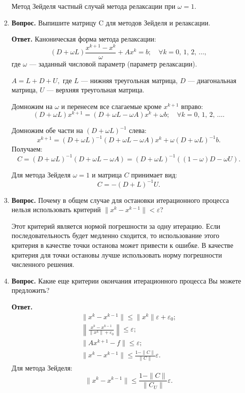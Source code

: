 \documentclass[12pt, a4paper]{article}
\begin{document}
\begin{enumerate}
  Метод Зейделя частный случай метода релаксации при $ \omega = 1 $.
  
  	\item  \textbf{Вопрос.}	Выпишите матрицу C для методов Зейделя и релаксации.
  	
  \textbf{Ответ.}	Каноническая форма метода релаксации:
  	$$	\left( D + \omega L \right) \frac{x^{k + 1} - x^k}{\omega} + A x^k = b;\quad \forall k = 0,\, 1,\, 2,\, \dots,$$ где $\omega$ --- заданный числовой параметр (параметр релаксации).
  	
  	 $ A = L + D + U,$ где $L$ --- нижняя треугольная матрица, $D$ --- диагональная матрица, $U$ --- верхняя треугольная матрица.
  	
  	Домножим на $\omega$ и перенесем все слагаемые кроме $x^{k + 1}$ вправо:
  	$$\left( D + \omega L \right)x^{k + 1} = \left( D + \omega L -\omega A \right)x^k +\omega b; \quad \forall k = 0,\, 1,\, 2,\, \dots. $$
  	
  	Домножим обе части на $ \left( D + \omega L \right)^{-1}$ слева:
  		$$x^{k + 1} = \left( D + \omega L \right)^{-1} \left( D + \omega L -\omega A \right)x^k +\omega \left( D + \omega L \right)^{-1} b. $$
  	Получаем:
  	$$ C = \left( D + \omega L \right)^{-1} \left( D + \omega L -\omega A \right) = \left( D + \omega L \right)^{-1} \left( \left( 1 - \omega \right) D  -\omega U \right).  $$
  	
  	Для метода Зейделя $\omega = 1$ и матрица $C$ принимает вид:
  	$$ C = - \left( D + L \right)^{-1}U.  $$ 
  	
 	\item  \textbf{Вопрос.} Почему в общем случае для остановки итерационного процесса нельзя использовать критерий $\| x^k - x^{k-1} \| < \varepsilon$?
 	
 	Этот критерий является нормой погрешности за одну итерацию. Если последовательность будет медленно сходится, то использование этого критерия в качестве точки останова может привести к ошибке. В качестве критерия для точки остановы лучше использовать норму погрешности численного решения.
 	
 	\item  \textbf{Вопрос.} Какие еще критерии окончания итерационного процесса Вы можете предложить?
 	
 	 \textbf{Ответ.}
 	\begin{gather*}
 		\| x^k - x^{k - 1} \| \leq \| x^k\| \varepsilon + \varepsilon_0; \\
 		\left\| \frac{ x^k - x^{k - 1}}{\| x^k \| + \varepsilon_0} \right\| \leq \varepsilon; \\
 		 		\| A x^{k + 1} - f \| \leq \varepsilon; \\
 		\| x^k - x^{k - 1}\| \leq \frac{1 - \| C \|}{\| C \|} \varepsilon. 
 	\end{gather*}
 	Для метода Зейделя:
 	$$\| x^k - x^{k - 1} \| \leq \frac{1-\| C \|}{\| C_U \|} \varepsilon.$$
 	
  	
  	
		\end{enumerate}

	
\end{document}
